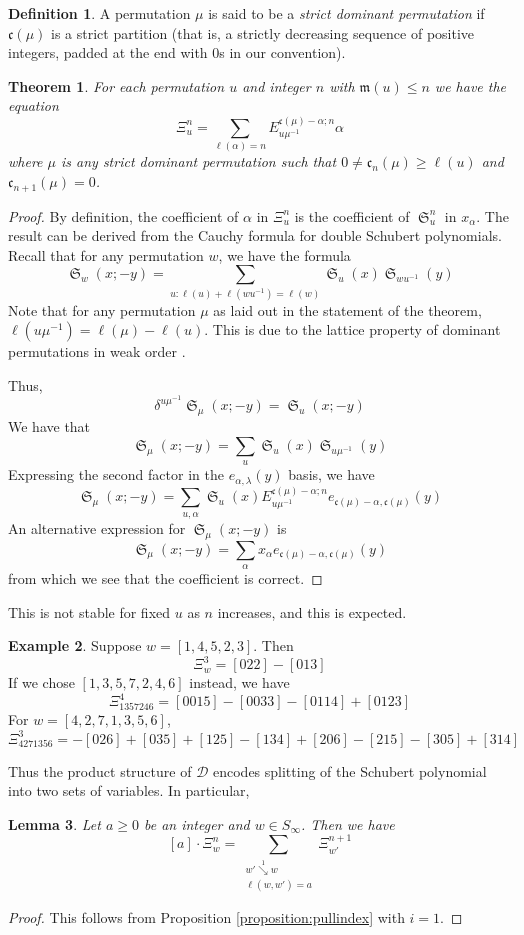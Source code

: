 \documentclass{amsart}
\newtheorem{lemma}{Lemma}[subsection]
\newtheorem{theorem}{Theorem}[section]
\theoremstyle{definition}
\newtheorem{definition}[lemma]{Definition}
\newtheorem{example}[lemma]{Example}
\theoremstyle{remark}
\numberwithin{equation}{subsection}
\DeclareMathOperator{\sch}{\mathfrak{S}}
\newcommand{\downvar}[1]{\stackrel{#1}{\searrow}}
\newcommand{\dsch}{\ensuremath{\Xi}}
\newcommand{\dcoma}{\mathcal{D}}
\newcommand{\code}{\mathfrak{c}}
\newcommand{\maxd}{\mathfrak{m}}
\begin{document}
\begin{definition}
A permutation $\mu$ is said to be a \emph{strict dominant permutation} if $\code(\mu)$ is a strict partition (that is, a strictly decreasing sequence of positive integers, padded at the end with $0$s in our convention).
\end{definition}

\begin{theorem}
	For each permutation $u$ and integer $n$ with $\maxd(u)\leq n$ we have the equation
	$$\dsch_u^{n} = \sum_{\ell(\alpha)=n} E^{\code(\mu)-\alpha;n}_{u\mu^{-1}}\alpha$$
	where $\mu$ is any strict dominant permutation such that $0\neq \code_n(\mu) \geq \ell(u)$ and $\code_{n+1}(\mu)=0$.
\end{theorem}
\begin{proof}
	By definition, the coefficient of $\alpha$ in $\dsch_u^n$ is the coefficient of $\sch_u^n$ in $x_\alpha$. The result can be derived from the Cauchy formula for double Schubert polynomials. Recall that for any permutation $w$, we have the formula
  $$\sch_w(x;-y) = \sum_{u:\ell(u)+\ell(wu^{-1})=\ell(w)} \sch_u(x)\sch_{wu^{-1}}(y)$$
  Note that for any permutation $\mu$ as laid out in the statement of the theorem, $\ell(u\mu^{-1})=\ell(\mu)-\ell(u)$. This is due to the lattice property of dominant permutations in weak order \cite{bjorner1997shellable}.

  Thus,
	$$\delta^{u\mu^{-1}}\sch_\mu(x;-y) = \sch_u(x;-y)$$
	We have that
	$$\sch_\mu(x;-y)=\sum_u \sch_u(x)\sch_{u\mu^{-1}}(y)$$
	Expressing the second factor in the $e_{\alpha,\lambda}(y)$ basis, we have
	$$\sch_\mu(x;-y)=\sum_{u,\alpha} \sch_u(x)E_{u\mu^{-1}}^{\code(\mu)-\alpha;n}e_{\code(\mu)-\alpha,\code(\mu)}(y)$$
	An alternative expression for $\sch_\mu(x;-y)$ is
	$$\sch_\mu(x;-y)=\sum_{\alpha} x_\alpha e_{\code(\mu)-\alpha,\code(\mu)}(y)$$
	from which we see that the coefficient is correct.
\end{proof}


This is not stable for fixed $u$ as $n$ increases, and this is expected.


\begin{example}
Suppose $w = [1,4,5,2,3]$. Then
$$\dsch_w^3 = [022] - [013]$$
If we chose $[1,3,5,7,2,4,6]$ instead, we have
$$\dsch_{1357246}^4 = [0015] - [0033] - [0114] + [0123]$$
For $w=[4,2,7,1,3,5,6]$,
$$\dsch_{4271356}^3 = -[026] + [035] + [125] - [134] + [206] - [215] - [305] + [314]$$
\end{example}

Thus the product structure of $\dcoma$ encodes splitting of the Schubert polynomial into two sets of variables. In particular,
\begin{lemma} \label{lemma:dpieri}
Let $a\geq 0$ be an integer and $w\in S_\infty$. Then we have
$$[a]\cdot \dsch_{w}^{n} = \sum_{\substack{w'\downvar{1} w\\ \ell(w,w')=a}} \dsch_{w'}^{n+1}$$
\end{lemma}
\begin{proof}
  This follows from Proposition \ref{proposition:pullindex} with $i=1$.
\end{proof}
\end{document}
